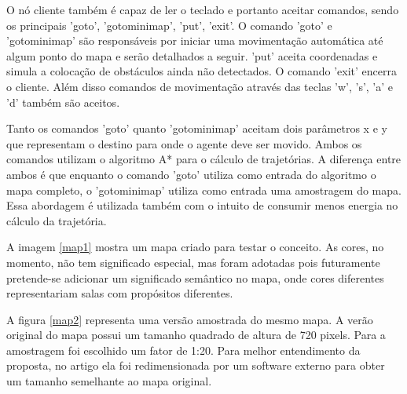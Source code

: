 \documentclass[eq,capa]{texufpel}
\begin{document}
O nó cliente também é capaz de ler o teclado e portanto aceitar comandos, sendo os principais 'goto', 'gotominimap', 'put', 'exit'. O comando 'goto' e 'gotominimap' são responsáveis por iniciar uma movimentação automática até algum ponto do mapa e serão detalhados a seguir. 'put' aceita coordenadas e simula a colocação de obstáculos ainda não detectados. O comando 'exit' encerra o cliente. Além disso comandos de movimentação através das teclas 'w', 's', 'a' e 'd' também são aceitos.

Tanto os comandos 'goto' quanto 'gotominimap' aceitam dois parâmetros x e y que representam o destino para onde o agente deve ser movido. Ambos os comandos utilizam o algoritmo A* para o cálculo de trajetórias. A diferença entre ambos é que enquanto o comando 'goto' utiliza como entrada do algoritmo o mapa completo, o 'gotominimap' utiliza como entrada uma amostragem do mapa. Essa abordagem é utilizada também com o intuito de consumir menos energia no cálculo da trajetória.




A imagem \ref{map1} mostra um mapa criado para testar o conceito. As cores, no momento, não tem significado especial, mas foram adotadas pois futuramente pretende-se adicionar um significado semântico no mapa, onde cores diferentes representariam salas com propósitos diferentes.

A figura \ref{map2} representa uma versão amostrada do mesmo mapa. A verão original do mapa possui um tamanho quadrado de altura de 720 pixels. Para a amostragem foi escolhido um fator de 1:20. Para melhor entendimento da proposta, no artigo ela foi redimensionada por um software externo para obter um tamanho semelhante ao mapa original.
\end{document}

